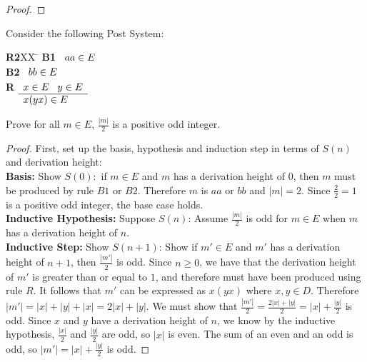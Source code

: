 \documentclass[]{exam}
\theoremstyle{definition}
\begin{document}
\begin{questions}
\begin{proof}
\end{proof}
\question Consider the following Post System:
\begin{tabbing}
{\bf R2}XX \=  \kill
{\bf B1} \>
        \(\begin{array}[t]{l}
        aa \in E
        \end{array}\) \\[2ex]
{\bf B2} \>
        \(\begin{array}[t]{l}
        bb \in E
        \end{array}\) \\[2ex]
{\bf R} \>
        \(\begin{array}[t]{l}
        x \in E \;\;\;y \in E \\
        \hline
        x(yx) \in E
        \end{array}\) 
\end{tabbing}
Prove for all $m \in E$, $\frac{|m|}{2}$ is a positive odd integer.  
\begin{proof}
First, set up the basis, hypothesis and induction step in terms of $S(n)$ and
derivation height:
~\\
\textbf{Basis:} Show $S(0):$ if $m \in E$ and $m$ has a derivation height of
$0$, then $m$ must be produced by rule $B1$ or $B2$. Therefore $m$ is $aa$ or $bb$ 
and $|m| = 2$. Since $\frac{2}{2} = 1$ is a positive odd integer, the base
case holds.
~\\
\textbf{Inductive Hypothesis:} Suppose $S(n)$: Assume $\frac{|m|}{2}$ is odd
for $m \in E$ when $m$ has a derivation height of $n$.
~\\
\textbf{Inductive Step:} Show $S(n+1)$: Show if $m' \in E$ and $m'$ has a
derivation height of $n + 1$, then $\frac{|m'|}{2}$ is odd.  Since $n \geq 0$,
we have that the derivation height of $m'$ is greater than or equal to
$1$, and therefore must have been produced using rule $R$. It follows
that $m'$ can be expressed as $x(yx)$ where $x,y \in D$. Therefore $|m'| = |x| +
|y| + |x| = 2|x| + |y|$. We must show that $\frac{|m'|}{2} = \frac{2|x| + |y|}{2} = |x| +
\frac{|y|}{2}$ is odd.  Since $x$ and $y$ have a derivation height of $n$,
we know by the inductive hypothesis, $\frac{|x|}{2}$ 
and $\frac{|y|}{2}$ are odd, so $|x|$ is even. The sum of an even and
an odd is odd, so $|m'| = |x| + \frac{|y|}{2}$ is odd.

\end{proof}



\end{questions}
\end{document}
